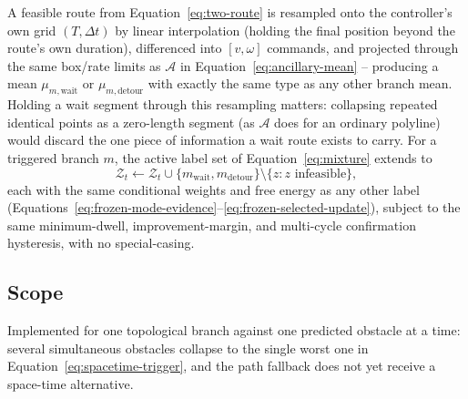\documentclass[11pt,a4paper]{article}
\begin{document}
A feasible route from Equation~\eqref{eq:two-route} is resampled onto the
controller's own grid $(T,\Delta t)$ by linear interpolation (holding the
final position beyond the route's own duration), differenced into
$[v,\omega]$ commands, and projected through the same box/rate limits as
$\mathcal A$ in Equation~\eqref{eq:ancillary-mean} -- producing a mean
$\mu_{m,\mathrm{wait}}$ or $\mu_{m,\mathrm{detour}}$ with exactly the same
type as any other branch mean. Holding a wait segment through this
resampling matters: collapsing repeated identical points as a zero-length
segment (as $\mathcal A$ does for an ordinary polyline) would discard the one
piece of information a wait route exists to carry. For a triggered branch
$m$, the active label set of Equation~\eqref{eq:mixture} extends to
\begin{equation}
  \mathcal Z_t\leftarrow\mathcal Z_t\cup
  \{m_{\mathrm{wait}},m_{\mathrm{detour}}\}\setminus
  \{z:z\text{ infeasible}\},
  \label{eq:spacetime-mode-extension}
\end{equation}
each with the same conditional weights and free energy as any other label
(Equations~\eqref{eq:frozen-mode-evidence}--\eqref{eq:frozen-selected-update}),
subject to the same minimum-dwell, improvement-margin, and multi-cycle
confirmation hysteresis, with no special-casing.

\subsection{Scope}

Implemented for one topological branch against one predicted obstacle at a
time: several simultaneous obstacles collapse to the single worst one in
Equation~\eqref{eq:spacetime-trigger}, and the path fallback does not yet
receive a space-time alternative.
\end{document}
